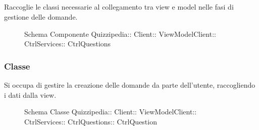 \subsection{}
Raccoglie le classi necessarie al collegamento tra view e model nelle fasi di gestione delle domande.
\begin{figure}[H]
\centering
\noindent{}
\caption[Schema Componente Quizzipedia::Client::ViewModelClient::CtrlServices::CtrlQuestions]{Schema Componente Quizzipedia:: Client:: ViewModelClient:: CtrlServices:: CtrlQuestions}
\end{figure}
\subsubsection{Classe }
Si occupa di gestire la creazione delle domande da parte dell'utente, raccogliendo i dati dalla view.
\begin{figure}[H]
\centering
\noindent{}
\caption[Schema Classe CtrlQuestion]{Schema Classe Quizzipedia:: Client:: ViewModelClient:: CtrlServices:: CtrlQuestions:: CtrlQuestion}
\end{figure}
